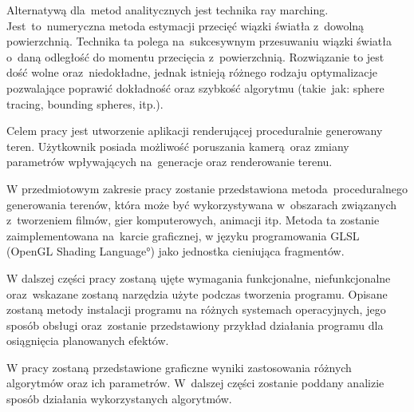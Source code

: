 Alternatywą dla~metod analitycznych jest technika ray marching. Jest~to~numeryczna metoda estymacji przecięć
wiązki światła z~dowolną powierzchnią\cite{bib:gpugems2}\cite{bib:spheretracing}.
Technika ta polega na~sukcesywnym przesuwaniu wiązki światła o~daną odległość do momentu przecięcia z~powierzchnią.
Rozwiązanie to jest dość wolne oraz~niedokładne, jednak istnieją różnego rodzaju optymalizacje
pozwalające poprawić dokładność oraz szybkość algorytmu\cite{bib:Liktor2008RayTI} (takie~jak: sphere tracing, bounding spheres, itp.).

Celem pracy jest utworzenie aplikacji renderującej proceduralnie generowany teren. Użytkownik posiada możliwość poruszania kamerą oraz zmiany parametrów wpływających na~generacje oraz renderowanie terenu.

W przedmiotowym zakresie pracy zostanie przedstawiona metoda proceduralnego generowania
terenów, która może być wykorzystywana w~obszarach związanych z~tworzeniem filmów, gier komputerowych, animacji itp. Metoda ta zostanie zaimplementowana na~karcie graficznej, w języku programowania GLSL (\ang{OpenGL Shading Language}) jako jednostka cieniująca fragmentów.

W dalszej części pracy zostaną ujęte wymagania funkcjonalne, niefunkcjonalne oraz~wskazane zostaną narzędzia użyte podczas tworzenia programu.
Opisane zostaną metody instalacji programu na różnych systemach operacyjnych, jego sposób obsługi oraz~zostanie przedstawiony przykład działania programu dla osiągnięcia planowanych efektów.

W pracy zostaną przedstawione graficzne wyniki zastosowania różnych algorytmów oraz ich parametrów. W~dalszej części zostanie poddany analizie sposób działania wykorzystanych algorytmów.


